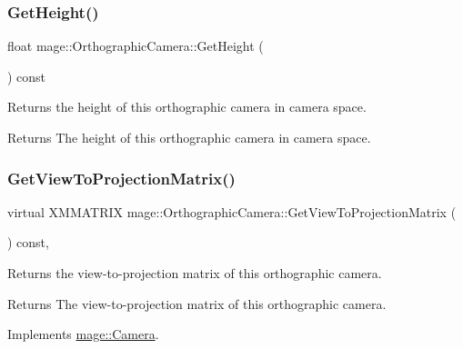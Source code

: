 \subsubsection{\texorpdfstring{Get\+Height()}{GetHeight()}}
{\footnotesize\ttfamily float mage\+::\+Orthographic\+Camera\+::\+Get\+Height (\begin{DoxyParamCaption}{ }\end{DoxyParamCaption}) const}

Returns the height of this orthographic camera in camera space.

\begin{DoxyReturn}{Returns}
The height of this orthographic camera in camera space. 
\end{DoxyReturn}
\hypertarget{classmage_1_1_orthographic_camera_aedd86e56a0f7bc967ad8d9be2631a0cf}{}\label{classmage_1_1_orthographic_camera_aedd86e56a0f7bc967ad8d9be2631a0cf} 
\subsubsection{\texorpdfstring{Get\+View\+To\+Projection\+Matrix()}{GetViewToProjectionMatrix()}}
{\footnotesize\ttfamily virtual X\+M\+M\+A\+T\+R\+IX mage\+::\+Orthographic\+Camera\+::\+Get\+View\+To\+Projection\+Matrix (\begin{DoxyParamCaption}{ }\end{DoxyParamCaption}) const\hspace{0.3cm}{\ttfamily [override]}, {\ttfamily [virtual]}}

Returns the view-\/to-\/projection matrix of this orthographic camera.

\begin{DoxyReturn}{Returns}
The view-\/to-\/projection matrix of this orthographic camera. 
\end{DoxyReturn}


Implements \hyperlink{classmage_1_1_camera_a1f5206864cf18b5548219492556df5d2}{mage\+::\+Camera}.

\hypertarget{classmage_1_1_orthographic_camera_ac8daeca630e0f4503354e3eede7ead5c}{}\label{classmage_1_1_orthographic_camera_ac8daeca630e0f4503354e3eede7ead5c} 
